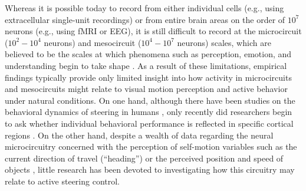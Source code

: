 Whereas it is possible today to record from either individual cells
(e.g., using extracellular single-unit recordings) or from entire brain areas
on the order of $10^7$ neurons (e.g., using \ac{fMRI} or \ac{EEG}),
it is still difficult to record at the microcircuit ($10^2-10^4$ neurons)
and mesocircuit ($10^4-10^7$ neurons) scales,
which are believed to be the scales at which phenomena such as perception, emotion,
and understanding begin to take shape \citep{Alivisatos2012}.
As a result of these limitations, empirical findings typically provide
only limited insight into how activity in microcircuits and mesocircuits
might relate to visual motion perception and active behavior under
natural conditions.
On one hand, although there have been studies on the behavioral dynamics of 
steering in humans \citep{FajenWarren2003,WilkieWann2003}, 
only recently did researchers begin to ask
whether individual behavioral performance is reflected in specific
cortical regions \citep{Billington2013,Field2007}.
On the other hand, despite a wealth of data regarding the neural
microcircuitry concerned with the perception of self-motion variables
such as the current direction of travel (``heading'') 
\citep{BrittenVanWezel1998,DuffyWurtz1997,Gu2006}
or the perceived position and speed of objects
\citep{EifukuWurtz1998,Tanaka1993},
little research has been devoted to investigating how this
circuitry may relate to active steering control.
%
%

